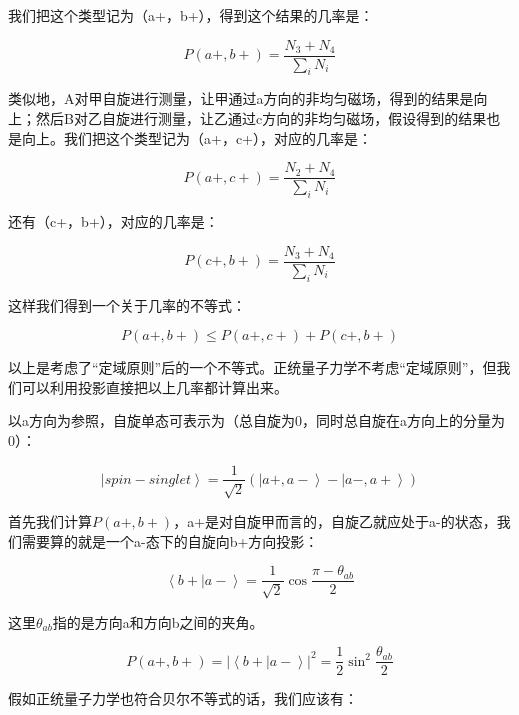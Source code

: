 我们把这个类型记为（a+，b+），得到这个结果的几率是：

\begin{equation}
P(a+, b+) = \frac{N_3 + N_4}{ \sum\limits_i N_i}
\end{equation}

类似地，A对甲自旋进行测量，让甲通过a方向的非均匀磁场，得到的结果是向上；然后B对乙自旋进行测量，让乙通过c方向的非均匀磁场，假设得到的结果也是向上。我们把这个类型记为（a+，c+），对应的几率是：

\begin{equation}
P(a+, c+) = \frac{N_2 + N_4}{ \sum\limits_i N_i}
\end{equation}

还有（c+，b+），对应的几率是：

\begin{equation}
P(c+, b+) = \frac{N_3 + N_4}{ \sum\limits_i N_i}
\end{equation}

这样我们得到一个关于几率的不等式：

\begin{equation}
P(a+, b+) \le P(a+, c+) + P(c+, b+)
\end{equation}

以上是考虑了“定域原则”后的一个不等式。正统量子力学不考虑“定域原则”，但我们可以利用投影直接把以上几率都计算出来。

以a方向为参照，自旋单态可表示为（总自旋为0，同时总自旋在a方向上的分量为0）：

\begin{equation}
\left| spin-singlet \right\rangle = \frac{1}{\sqrt{2}}\left( \left|{a+, a- }  \right\rangle  - \left|{a-, a+ }  \right\rangle \right)
\end{equation}

首先我们计算$P(a+, b+)$，a+是对自旋甲而言的，自旋乙就应处于a-的状态，我们需要算的就是一个a-态下的自旋向b+方向投影：

\begin{equation}
\left\langle {b+} | {a-} \right\rangle = \frac{1}{\sqrt{2}} \cos \frac{\pi - \theta_{ab}}{2} 
\end{equation}

这里$\theta_{ab}$指的是方向a和方向b之间的夹角。

\begin{equation}
P(a+, b+) = \left| {\left\langle {b+} | {a-} \right\rangle} \right|^2 = \frac{1}{2} \sin^2 \frac{\theta_{ab}}{2}
\end{equation}

假如正统量子力学也符合贝尔不等式的话，我们应该有：

